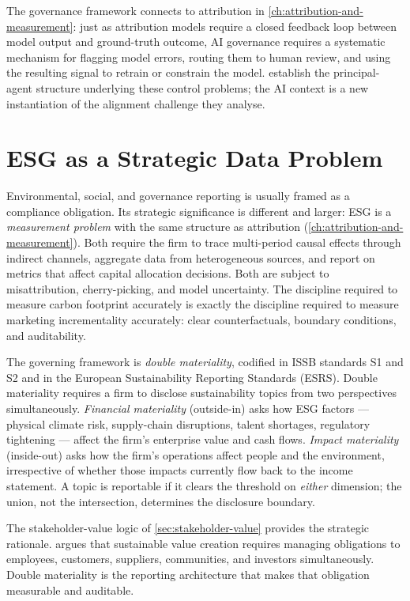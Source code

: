 The governance framework connects to attribution in \cref{ch:attribution-and-measurement}: just
as attribution models require a closed feedback loop between model output and ground-truth
outcome, AI governance requires a systematic mechanism for flagging model errors, routing them
to human review, and using the resulting signal to retrain or constrain the model.
\textcite{jensen1976agency} establish the principal-agent structure underlying these control
problems; the AI context is a new instantiation of the alignment challenge they analyse.

\section{ESG as a Strategic Data Problem}\label{sec:esg-data}

Environmental, social, and governance reporting is usually framed as a compliance obligation.
Its strategic significance is different and larger: ESG is a \emph{measurement problem} with
the same structure as attribution (\cref{ch:attribution-and-measurement}). Both require the
firm to trace multi-period causal effects through indirect channels, aggregate data from
heterogeneous sources, and report on metrics that affect capital allocation decisions. Both
are subject to misattribution, cherry-picking, and model uncertainty. The discipline required
to measure carbon footprint accurately is exactly the discipline required to measure marketing
incrementality accurately: clear counterfactuals, boundary conditions, and auditability.

The governing framework is \emph{double materiality}, codified in ISSB standards S1 and S2
and in the European Sustainability Reporting Standards (ESRS). Double materiality requires
a firm to disclose sustainability topics from two perspectives simultaneously. \emph{Financial
materiality} (outside-in) asks how ESG factors — physical climate risk, supply-chain
disruptions, talent shortages, regulatory tightening — affect the firm's enterprise value
and cash flows. \emph{Impact materiality} (inside-out) asks how the firm's operations affect
people and the environment, irrespective of whether those impacts currently flow back to the
income statement. A topic is reportable if it clears the threshold on \emph{either}
dimension; the union, not the intersection, determines the disclosure boundary.

The stakeholder-value logic of \cref{sec:stakeholder-value} provides the strategic rationale.
\textcite{freeman2010strategic} argues that sustainable value creation requires managing
obligations to employees, customers, suppliers, communities, and investors simultaneously.
Double materiality is the reporting architecture that makes that obligation measurable and
auditable.

